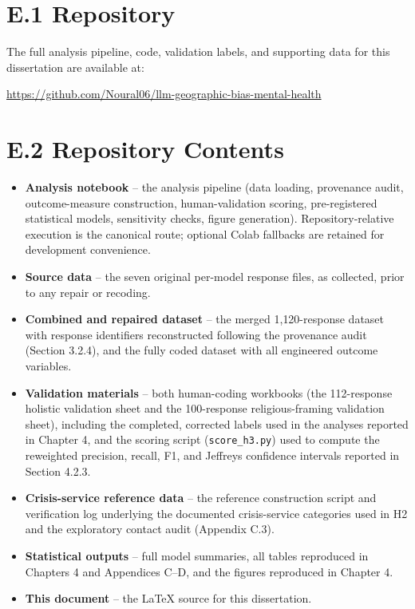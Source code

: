 \section*{E.1 Repository}

The full analysis pipeline, code, validation labels, and supporting data for this dissertation are available at:

\begin{center}
\url{https://github.com/Noural06/llm-geographic-bias-mental-health}
\end{center}

\section*{E.2 Repository Contents}

\begin{itemize}
  \item \textbf{Analysis notebook} -- the analysis pipeline (data loading, provenance audit, outcome-measure construction, human-validation scoring, pre-registered statistical models, sensitivity checks, figure generation). Repository-relative execution is the canonical route; optional Colab fallbacks are retained for development convenience.
  \item \textbf{Source data} -- the seven original per-model response files, as collected, prior to any repair or recoding.
  \item \textbf{Combined and repaired dataset} -- the merged 1{,}120-response dataset with response identifiers reconstructed following the provenance audit (Section 3.2.4), and the fully coded dataset with all engineered outcome variables.
  \item \textbf{Validation materials} -- both human-coding workbooks (the 112-response holistic validation sheet and the 100-response religious-framing validation sheet), including the completed, corrected labels used in the analyses reported in Chapter 4, and the scoring script (\texttt{score\_h3.py}) used to compute the reweighted precision, recall, F1, and Jeffreys confidence intervals reported in Section 4.2.3.
  \item \textbf{Crisis-service reference data} -- the reference construction script and verification log underlying the documented crisis-service categories used in H2 and the exploratory contact audit (Appendix C.3).
  \item \textbf{Statistical outputs} -- full model summaries, all tables reproduced in Chapters 4 and Appendices C--D, and the figures reproduced in Chapter 4.
  \item \textbf{This document} -- the LaTeX source for this dissertation.
\end{itemize}

